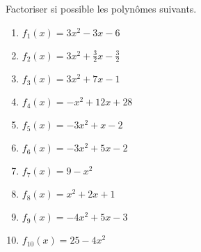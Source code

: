 
\begin{exercice}\label{exoPremiere-0047}

    Factoriser si possible les polynômes suivants.
    \begin{multicols}{3}
        \begin{enumerate}
            \item
                \( f_1(x)=3x^2-3x-6\)
            \item
                \( f_2(x)=3x^2+\frac{ 3 }{ 2 }x-\frac{ 3 }{2}\)
            \item
                \( f_3(x)=3x^2+7x-1\)
            \item
                \( f_4(x)=-x^2+12x+28\)
            \item
                \( f_5(x)=-3x^2+x-2\)
            \item
                \( f_6(x)=-3x^2+5x-2\)
            \item
                \( f_7(x)=9-x^2\)
            \item
                \( f_8(x)=x^2+2x+1\)
            \item
                \( f_9(x)=-4x^2+5x-3\)
            \item
                \( f_{10}(x)=25-4x^2\)
        \end{enumerate}
    \end{multicols}

\end{exercice}
